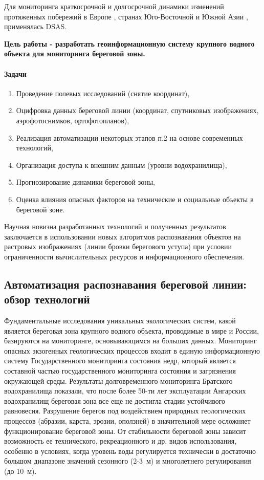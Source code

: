 \documentclass[732,14pt,final]{studrep}
\begin{document}
Для мониторинга краткосрочной и долгосрочной динамики изменений протяженных побережий в Европе \cite{kabuth14}, странах Юго-Восточной и Южной Азии \cite{isha20},\cite{Matin21} применялась DSAS.

\textbf{Цель работы  - разработать геоинформационную систему крупного водного объекта для мониторинга береговой зоны.}

\paragraph{Задачи}
\begin{enumerate}
\item Проведение полевых исследований (снятие координат),
\item  Оцифровка данных береговой линии (координат, спутниковых изображениях, аэрофотоснимков, ортофотопланов),
\item  Реализация автоматизации некоторых этапов п.2 на основе современных технологий,
\item  Организация доступа к внешним данным (уровни водохранилища),
\item  Прогнозирование динамики береговой зоны,
\item  Оценка влияния опасных факторов на технические и социальные объекты в береговой зоне.
\end{enumerate}

Научная новизна разработанных технологий и полученных результатов заключается в использовании новых алгоритмов распознавания объектов на растровых изображениях (линии бровки берегового уступа) при условии ограниченности вычислительных ресурсов и информационного обеспечения.


\subsection*{Автоматизация распознавания береговой линии: обзор технологий}

Фундаментальные исследования уникальных экологических систем, какой является береговая зона крупного водного объекта, проводимые в мире и России, базируются на мониторинге, основывающимся на больших данных. Мониторинг опасных экзогенных геологических процессов входит в единую информационную систему Государственного мониторинга состояния недр, который является составной частью государственного мониторинга состояния и загрязнения окружающей среды. Результаты долговременного мониторинга Братского водохранилища показали, что после более 50-ти лет эксплуатации Ангарских водохранилищ береговая зона все еще не достигла стадии устойчивого равновесия. Разрушение берегов под воздействием природных геологических процессов (абразии, карста, эрозии, оползней) в значительной мере осложняет функционирование береговой зоны. От стабильности береговой зоны зависит возможность ее технического, рекреационного и др. видов использования, особенно в условиях, когда уровень воды регулируется технически в достаточно большом диапазоне значений сезонного (2-3~м) и многолетнего регулирования (до 10~м).
\end{document}
